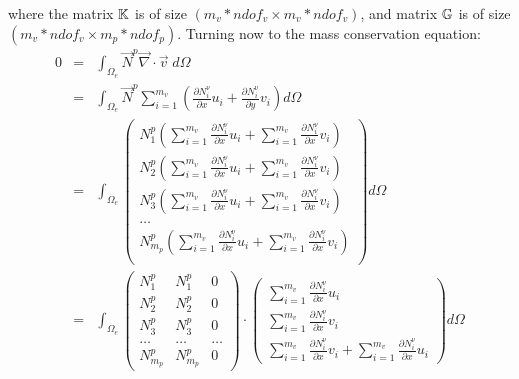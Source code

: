 where the matrix ${\mathbb{K}}$ is of size $(m_v*ndof_v \times m_v*ndof_v)$, 
and matrix ${{\mathbb{G}}}$ is of size $(m_v*ndof_v \times m_p*ndof_p)$.
Turning now to the mass conservation equation:
\begin{eqnarray}
0&=&\int_{\Omega_e} \vec{N}^p {\vec \nabla}\cdot {\vec v} \; d\Omega \nonumber\\
&=& \int_{\Omega_e} \vec{N}^p \sum_{i=1}^{m_v} 
\left( \frac{\partial N_i^\upnu}{\partial x} u_i + \frac{\partial N_i^\upnu}{\partial y} v_i \right)  
d\Omega \nonumber\\
&=& 
\int_{\Omega_e} 
\left(
\begin{array}{c}
N_1^p \left(\sum\limits_{i=1}^{m_v} \frac{\partial N_i^\upnu }{\partial x} u_i +
\sum\limits_{i=1}^{m_v} \frac{\partial N_i^\upnu }{\partial x} v_i \right) \\
N_2^p \left(\sum\limits_{i=1}^{m_v} \frac{\partial N_i^\upnu }{\partial x} u_i +
\sum\limits_{i=1}^{m_v} \frac{\partial N_i^\upnu }{\partial x} v_i \right) \\
N_3^p \left(\sum\limits_{i=1}^{m_v} \frac{\partial N_i^\upnu }{\partial x} u_i +
\sum\limits_{i=1}^{m_v} \frac{\partial N_i^\upnu }{\partial x} v_i \right) \\
\dots \\
N_{m_p}^p \left(\sum\limits_{i=1}^{m_v} \frac{\partial N_i^\upnu }{\partial x} u_i +
\sum\limits_{i=1}^{m_v} \frac{\partial N_i^\upnu }{\partial x} v_i \right) \\
\end{array}
\right) d \Omega \nonumber \\  %
&=& 
\int_{\Omega_e} 
\left(
\begin{array}{ccc}
{N}_1^p & {N}_1^p & 0 \\
{N}_2^p & {N}_2^p & 0 \\
{N}_3^p & {N}_3^p & 0 \\
\dots & \dots & \dots \\
{N}_{m_p}^p & {N}_{m_p}^p & 0 
\end{array}
\right)
\cdot
\left(
\begin{array}{c}
\sum\limits_{i=1}^{m_v} \frac{\partial N_i^\upnu}{\partial x} u_i \\ 
\sum\limits_{i=1}^{m_v} \frac{\partial N_i^\upnu}{\partial x} v_i \\
\sum\limits_{i=1}^{m_v} \frac{\partial N_i^\upnu}{\partial x} v_i +
\sum\limits_{i=1}^{m_v} \frac{\partial N_i^\upnu}{\partial x} u_i 
\end{array}
\right) d\Omega \nonumber\\ %

\end{eqnarray}

